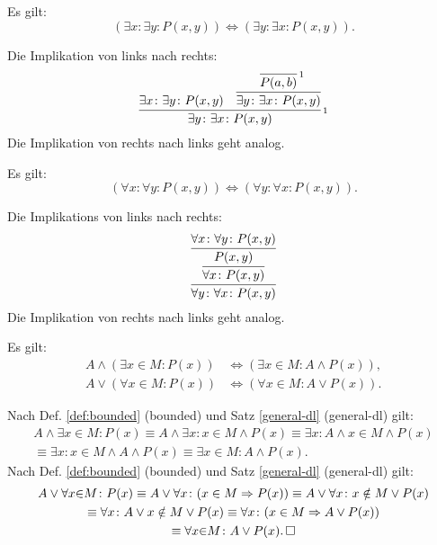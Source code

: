 \begin{Satz}\label{exists-cl}
Es gilt:
\[(\exists x\colon\exists y\colon P(x,y)) \iff (\exists y\colon\exists x\colon P(x,y)).\]
\end{Satz}
\begin{Beweis}
Die Implikation von links nach rechts:
\[\infer[\infernote{1}]{\exists y\colon\exists x\colon P(x,y)}{
  \exists x\colon\exists y\colon P(x,y)
  &
  \infer{\exists y\colon \exists x\colon P(x, y)}{
    \infer[\infernote{1}]{P(a,b)}{}}
}\]
Die Implikation von rechts nach links geht analog.\,\qedsymbol
\end{Beweis}

\begin{Satz}\label{all-cl}
Es gilt:
\[(\forall x\colon\forall y\colon P(x,y))
\iff (\forall y\colon\forall x\colon P(x,y)).\]
\end{Satz}
\begin{Beweis}
Die Implikations von links nach rechts:
\[\infer{\forall y\colon\forall x\colon P(x,y)}{
  \infer{\forall x\colon P(x,y)}{
    \infer{P(x,y)}{\forall x\colon\forall y\colon P(x,y)}}
}\]
Die Implikation von rechts nach links geht analog.\,\qedsymbol
\end{Beweis}

\begin{Satz}%
\label{bounded-general-dl}
Es gilt:
\begin{align}
A\land (\exists x{\in}M\colon P(x)) &\iff (\exists x{\in}M\colon A\land P(x)),\\
A\lor (\forall x{\in}M\colon P(x)) &\iff (\forall x{\in}M\colon A\lor P(x)).
\end{align}
\end{Satz}

\begin{Beweis}
Nach Def. \ref{def:bounded} (bounded)
und Satz \ref{general-dl} (general-dl) gilt:
\begin{gather*}
A\land \exists x{\in}M\colon P(x)
\equiv A\land \exists x\colon x\in M\land P(x)
\equiv \exists x\colon A\land x\in M\land P(x)\\
\equiv \exists x\colon x\in M\land A\land P(x)
\equiv \exists x{\in}M\colon A\land P(x).
\end{gather*}
Nach Def. \ref{def:bounded} (bounded)
und Satz \ref{general-dl} (general-dl) gilt:
\begin{gather*}
A\lor\forall x{\in}M\colon P(x)
\equiv A\lor\forall x\colon (x\in M\Rightarrow P(x))
\equiv A\lor\forall x\colon x\notin M\lor P(x)\\
\equiv \forall x\colon A\lor x\notin M\lor P(x)
\equiv \forall x\colon (x\in M\Rightarrow A\lor P(x))\\
\equiv \forall x{\in}M\colon A\lor P(x).\,\square
\end{gather*}
\end{Beweis}

